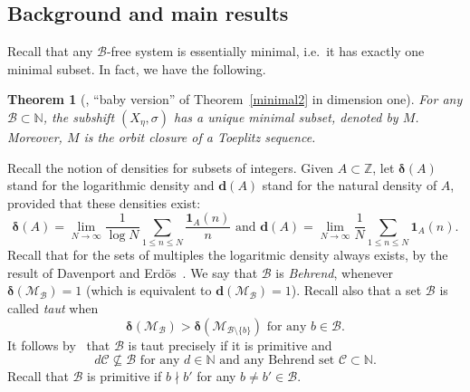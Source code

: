\documentclass[leqno,a4paper,12pt]{article}
\newtheorem{Th}{Theorem}[section]
\theoremstyle{definition}
\newcommand{\ndivides}{\nmid}
\newcommand{\cm}{{\cal M}}
\newcommand{\Z}{{\mathbb{Z}}}
\newcommand{\N}{{\mathbb{N}}}
\newcommand{\cC}{\mathcal{C}}
\newcommand{\sB}{\mathscr{B}}
\begin{document}
\subsection{Background and main results}
Recall that any $\sB$-free system is essentially minimal, i.e.\ it has exactly one minimal subset. In fact, we have the following.
\begin{Th}[{\cite[Theorem A]{MR3803141}},  ``baby version'' of Theorem~\ref{minimal2} in dimension one]\label{minimal_basic}
For any $\mathscr{B}\subset \N$, the subshift $(X_\eta,\sigma)$ has a unique minimal subset, denoted by $M$. Moreover, $M$ is the orbit closure of a Toeplitz sequence.
\end{Th}
Recall the notion of densities for subsets of integers. Given $A\subset \Z$, let $\bm{\delta}(A)$ stand for the logarithmic density and $\bm{d}(A)$ stand for the natural density of $A$, provided that these densities exist:
\[
\bm{\delta}(A)=\lim_{N\to \infty}\frac{1}{\log N}\sum_{1\leq n\leq N}\frac{\bm{1}_A(n)}{n} \text{ and }\bm{d}(A)=\lim_{N\to \infty}\frac{1}{N}\sum_{1\leq n\leq N}\bm{1}_A(n).
\]
Recall that for the sets of multiples the logaritmic density always exists, by the result of Davenport and Erd\"os~\cite{MR43835}. We say that $\mathscr{B}$ is \emph{Behrend}, whenever $\bm{\delta}(\mathcal{M}_\mathscr{B})=1$ (which is equivalent to $\bm{d}(\mathcal{M}_\mathscr{B})=1$). Recall also that a set $\mathscr{B}$ is called \emph{taut} when
\[
\bm{\delta}(\mathcal{M}_{\mathscr{B}})>\bm{\delta}(\mathcal{M}_{\mathscr{B}\setminus \{b\}}) \text{ for any }b\in\mathscr{B}.
\]
It follows by~\cite[Corollary 0.19]{MR1414678} that $\mathscr{B}$ is taut precisely if it is primitive and
\[
d\cC\not\subseteq \mathscr{B} \text{ for any }d\in\N \text{ and any Behrend set }\cC\subset\N.
\]
Recall that $\mathscr{B}$ is primitive if $b\ndivides b'$ for any $b\neq b'\in\mathscr{B}$.

\end{document}
